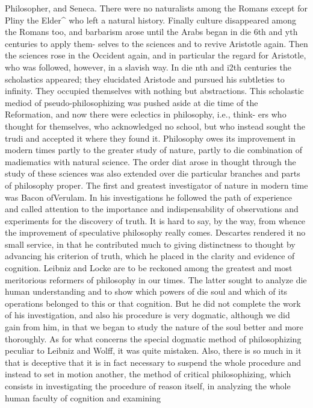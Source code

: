 Philosopher, and Seneca. There were no naturalists among the Romans
except for Pliny the Elder^ who left a natural history.
Finally culture disappeared among the Romans too, and barbarism
arose until the Arabs began in die 6th and yth centuries to apply them-
selves to the sciences and to revive Aristotle again. Then the sciences rose
in the Occident again, and in particular the regard for Aristotle, who was
followed, however, in a slavish way. In die nth and i2th centuries the
scholastics appeared; they elucidated Aristode and pursued his subtleties to
infinity. They occupied themselves with nothing but abstractions. This
scholastic mediod of pseudo-philosophizing was pushed aside at die time
of the Reformation, and now there were eclectics in philosophy, i.e., think-
ers who thought for themselves, who acknowledged no school, but who
instead sought the trudi and accepted it where they found it.
Philosophy owes its improvement in modern times partly to the greater
study of nature, partly to die combination of madiematics with natural
science. The order diat arose in thought through the study of these
sciences was also extended over die particular branches and parts of
philosophy proper. The first and greatest investigator of nature in modern
time was Bacon ofVerulam. In his investigations he followed the path of
experience and called attention to the importance and indispensability of
observations and experiments for the discovery of truth. It is hard to say, by
the way, from whence the improvement of speculative philosophy really
comes. Descartes rendered it no small service, in that he contributed much
to giving distinctness to thought by advancing his criterion of truth, which he
placed in the clarity and evidence of cognition.
Leibniz and Locke are to be reckoned among the greatest and most
meritorious reformers of philosophy in our times. The latter sought to
analyze die human understanding and to show which powers of die soul
and which of its operations belonged to this or that cognition. But he did
not complete the work of his investigation, and also his procedure is very
dogmatic, although we did gain from him, in that we began to study the
nature of the soul better and more thoroughly.
As for what concerns the special dogmatic method of philosophizing
peculiar to Leibniz and Wolff, it was quite mistaken. Also, there is so much
in it that is deceptive that it is in fact necessary to suspend the whole
procedure and instead to set in motion another, the method of critical
philosophizing, which consists in investigating the procedure of reason
itself, in analyzing the whole human faculty of cognition and examining

